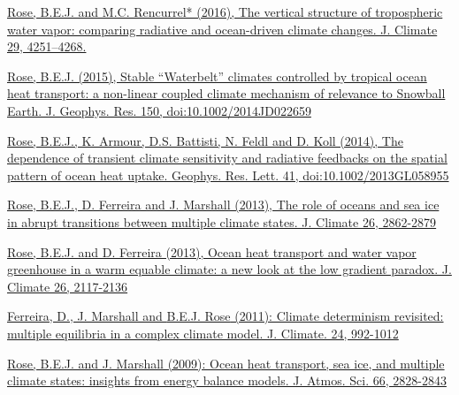 \documentclass[11pt, letterpaper]{article} %
\newcommand{\years}[1]{\marginnote{\scriptsize #1}} %
\newcommand{\publink}{http://www.atmos.albany.edu/facstaff/brose/resources/Publications/}
\begin{document}
\href{\publink Rose_Rencurrel_JClim2016.pdf}{\underline{Rose, B.E.J.} and M.C. Rencurrel* (2016), The vertical structure of tropospheric water vapor: comparing radiative and ocean-driven climate changes. J. Climate 29, 4251--4268.}
\vspace{0.2 cm}
 
\years{2015}  
\href{\publink Rose_JGR2015.pdf}{\underline{Rose, B.E.J.} (2015), Stable ``Waterbelt'' climates controlled by tropical ocean heat transport: a non-linear coupled climate mechanism of relevance to Snowball Earth. J. Geophys. Res. 150, doi:10.1002/2014JD022659}
\vspace{0.2 cm}
 
\years{2014}  
\href{\publink Rose_etal_GRL2014.pdf}{\underline{Rose, B.E.J.}, K. Armour, D.S. Battisti, N. Feldl and D. Koll (2014), The dependence of transient climate sensitivity and radiative feedbacks on the spatial pattern of ocean heat uptake. Geophys. Res. Lett. 41, doi:10.1002/2013GL058955}
  
 
\years{2013}  
\href{\publink Rose_etal_transitions_JClim2013.pdf}{\underline{Rose, B.E.J.}, D. Ferreira and J. Marshall (2013), The role of oceans and sea ice in abrupt transitions between multiple climate states. J. Climate 26, 2862-2879}
\vspace{0.2 cm}

\href{\publink Rose_Ferreira_JClim2013.pdf}{\underline{Rose, B.E.J.} and D. Ferreira (2013), Ocean heat transport and water vapor greenhouse in a warm equable climate: a new look at the low gradient paradox. J. Climate 26, 2117-2136}
\vspace{0.2 cm}

\years{2011}  
\href{\publink FMR_JClim2011_MultipleEq.pdf}{Ferreira, D., J. Marshall and \underline{B.E.J. Rose} (2011): Climate determinism revisited: multiple equilibria in a complex climate model. J. Climate. 24, 992-1012}
\vspace{0.2 cm}
  
\years{2009}  
\href{\publink Rose_Marshall_JAS2009.pdf}{\underline{Rose, B.E.J.} and J. Marshall (2009): Ocean heat transport, sea ice, and multiple climate states: insights from energy balance models. J. Atmos. Sci. 66, 2828-2843}
\vspace{0.2 cm}
  
\end{document}

